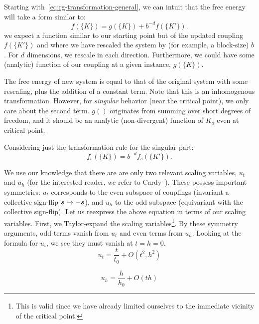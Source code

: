 Starting with~\ref{eq:rg-transformation-general}, we can intuit that
the free energy will take a form similar to:%
\begin{equation}
  f(\{K\})=g(\{K\})+ b^{-d}f(\{K'\}).
\end{equation}
we expect a function similar to our starting point but of the updated
coupling $f(\{K'\})$ and where we have rescaled the system by (for
example, a block-size) $b$. For $d$ dimensions, we rescale in each
direction. Furthermore, we could have some (analytic) function of our
coupling at a given instance, $g(\{K\})$.

The free energy of new system is equal to that of the original system
with some rescaling, plus the addition of a constant term. Note that
this is an inhomogenous transformation. However, for \textit{singular}
behavior (near the critical point), we only care about the second
term. $g()$ originates from summing over short degrees of freedom, and
it should be an analytic (non-divergent) function of $K_a$ even at
critical point.

Considering just the transformation rule for the singular part:
\begin{equation}
  f_s(\{K\})=b^{-d}f_s(\{K'\}).\label{eq:f-singular-transformation}
\end{equation}

We use our knowledge that there are are only two relevant scaling
variables, $u_t$ and $u_h$ (for the interested reader, we refer to
Cardy~\cite{cardy}). These possess important symmetries: $u_t$
corresponds to the even subspace of couplings (invariant a collective
sign-flip $\boldsymbol{s}\rightarrow -\boldsymbol{s}$), and $u_h$ to the odd subspace
(equivariant with the collective sign-flip). Let us reexpress the
above equation in terms of our scaling variables. First, we
Taylor-expand the scaling variables\footnote{This is valid since we
  have already limited ourselves to the immediate vicinity of the
  critical point.}. By these symmetry arguments, odd terms vanish from
$u_t$ and even terms from $u_h$. Looking at the formula for $u_i$, we
see they must vanish at $t=h=0$.
\begin{equation}
  u_t = \frac{t}{t_0} + O(t^2, h^2)\label{eq:u-t}
\end{equation}

\begin{equation}
  u_h = \frac{h}{h_0} + O(th)\label{eq:u-h}
\end{equation}

